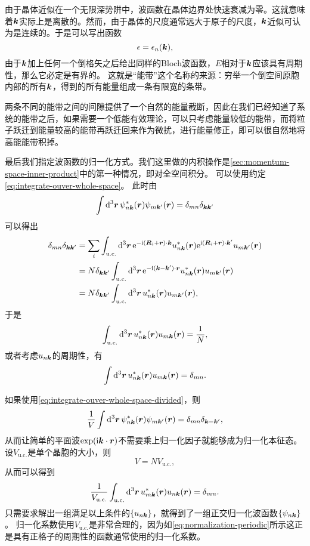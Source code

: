 由于晶体近似在一个无限深势阱中，波函数在晶体边界处快速衰减为零。这就意味着$\vb*{k}$实际上是离散的。然而，由于晶体的尺度通常远大于原子的尺度，$\vb*{k}$近似可认为是连续的。于是可以写出函数
\[
    \epsilon = \epsilon_n(\vb*{k}),
\]
由于$\vb*{k}$加上任何一个倒格矢之后给出同样的Bloch波函数，$E$相对于$\vb*{k}$应该具有周期性，那么它必定是有界的。
这就是“能带”这个名称的来源：穷举一个倒空间原胞内部的所有$\vb*{k}$，得到的所有能量组成一条有限宽的条带。

两条不同的能带之间的间隙提供了一个自然的能量截断，因此在我们已经知道了系统的能带之后，如果需要一个低能有效理论，可以只考虑能量较低的能带，而将粒子跃迁到能量较高的能带再跃迁回来作为微扰，进行能量修正，即可以很自然地将高能能带积掉。

最后我们指定波函数的归一化方式。我们这里做的内积操作是\autoref{sec:momentum-space-inner-product}中的第一种情况，即对全空间积分。
可以使用约定\eqref{eq:integrate-ouver-whole-space}。
此时由
\begin{equation}
    \int \dd[3]{\vb*{r}} \psi_{n \vb*{k}}^*(\vb*{r}) \psi_{m \vb*{k}'}(\vb*{r}) = \delta_{mn} \delta_{\vb*{k} \vb*{k}'}
\end{equation}
可以得出
\[
    \begin{aligned}
        \delta_{mn} \delta_{\vb*{k} \vb*{k}'} &= \sum_{i} \int_\text{u.c.} \dd[3]{\vb*{r}} \mathrm{e}^{- \mathrm{i} (\vb*{R}_i + \vb*{r}) \cdot \vb*{k}} u_{n \vb*{k}}^*(\vb*{r}) \mathrm{e}^{\mathrm{i} (\vb*{R}_i + \vb*{r}) \cdot \vb*{k}'} u_{m \vb*{k}'}(\vb*{r}) \\
        &= N \delta_{\vb*{k} \vb*{k}'} \int_\text{u.c.} \dd[3]{\vb*{r}} \mathrm{e}^{- \mathrm{i} (\vb*{k} - \vb*{k}') \cdot \vb*{r}} u_{n \vb*{k}}^*(\vb*{r}) u_{m \vb*{k}'}(\vb*{r}) \\
        &= N \delta_{\vb*{k} \vb*{k}'} \int_\text{u.c.} \dd[3]{\vb*{r}} u_{n \vb*{k}}^*(\vb*{r}) u_{m \vb*{k}'}(\vb*{r}),
    \end{aligned}
\]
于是
\[
    \int_\text{u.c.} \dd[3]{\vb*{r}} u^*_{n \vb*{k}}(\vb*{r}) u_{m \vb*{k}}(\vb*{r}) = \frac{1}{N},
\]
或者考虑$u_{n \vb*{k}}$的周期性，有
\begin{equation}
    \int \dd[3]{\vb*{r}} u^*_{n \vb*{k}}(\vb*{r}) u_{m \vb*{k}}(\vb*{r}) = \delta_{mn}. 
\end{equation}

如果使用\eqref{eq:integrate-ouver-whole-space-divided}，则
\begin{equation}
    \frac{1}{V} \int \dd[3]{\vb*{r}} \psi_{n\vb*{k}}^*(\vb*{r}) \psi_{m\vb*{k}'}(\vb*{r}) = \delta_{mn} \delta_{\vb*{k} - \vb*{k}'},
    \label{eq:bloch-is-basis}
\end{equation}
从而让简单的平面波$\exp(\mathrm{i} \vb*{k} \cdot \vb*{r})$不需要乘上归一化因子就能够成为归一化本征态。
设$V_\text{u.c.}$是单个晶胞的大小，则
\[
    V = N V_\text{u.c.},
\]
从而可以得到
\begin{equation}
    \frac{1}{V_\text{u.c.}} \int_\text{u.c.} \dd[3]{\vb*{r}} u_{m\vb*{k}}^*(\vb*{r}) u_{n\vb*{k}}(\vb*{r}) = \delta_{mn}.
\end{equation}
只需要求解出一组满足以上条件的$\{u_{n\vb*{k}}\}$，就得到了一组正交归一化波函数$\{\psi_{n\vb*{k}}\}$。
归一化系数使用$V_\text{u.c.}$是非常合理的，因为如\eqref{eq:normalization-periodic}所示这正是具有正格子的周期性的函数通常使用的归一化系数。


